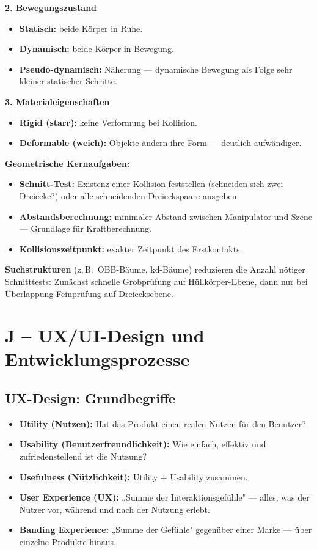 \documentclass[12pt, a4paper]{article}
\begin{document}
\textbf{2. Bewegungszustand}
\begin{itemize}
  \item \textbf{Statisch:} beide Körper in Ruhe.
  \item \textbf{Dynamisch:} beide Körper in Bewegung.
  \item \textbf{Pseudo-dynamisch:} Näherung — dynamische Bewegung als Folge sehr kleiner statischer Schritte.
\end{itemize}

\textbf{3. Materialeigenschaften}
\begin{itemize}
  \item \textbf{Rigid (starr):} keine Verformung bei Kollision.
  \item \textbf{Deformable (weich):} Objekte ändern ihre Form — deutlich aufwändiger.
\end{itemize}

\textbf{Geometrische Kernaufgaben:}
\begin{itemize}
  \item \textbf{Schnitt-Test:} Existenz einer Kollision feststellen (schneiden sich zwei Dreiecke?) oder alle schneidenden Dreieckspaare ausgeben.
  \item \textbf{Abstandsberechnung:} minimaler Abstand zwischen Manipulator und Szene — Grundlage für Kraftberechnung.
  \item \textbf{Kollisionszeitpunkt:} exakter Zeitpunkt des Erstkontakts.
\end{itemize}

\textbf{Suchstrukturen} (z.\,B.\ OBB-Bäume, kd-Bäume) reduzieren die Anzahl nötiger Schnitttests: Zunächst schnelle Grobprüfung auf Hüllkörper-Ebene, dann nur bei Überlappung Feinprüfung auf Dreiecksebene.

\section{J -- UX/UI-Design und Entwicklungsprozesse}

\subsection{UX-Design: Grundbegriffe}

\begin{itemize}
  \item \textbf{Utility (Nutzen):} Hat das Produkt einen realen Nutzen für den Benutzer?
  \item \textbf{Usability (Benutzerfreundlichkeit):} Wie einfach, effektiv und zufriedenstellend ist die Nutzung?
  \item \textbf{Usefulness (Nützlichkeit):} Utility + Usability zusammen.
  \item \textbf{User Experience (UX):} „Summe der Interaktionsgefühle" — alles, was der Nutzer vor, während und nach der Nutzung erlebt.
  \item \textbf{Banding Experience:} „Summe der Gefühle" gegenüber einer Marke — über einzelne Produkte hinaus.
\end{itemize}
\end{document}
